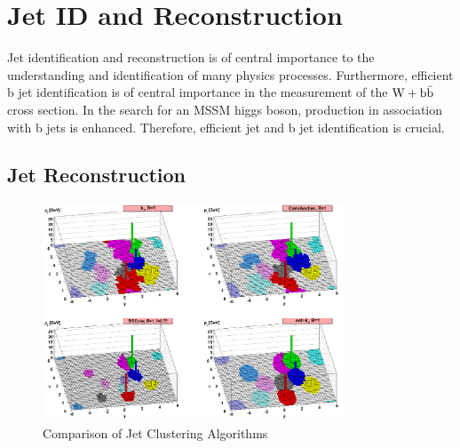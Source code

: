 \section{Jet ID and Reconstruction}

Jet identification and reconstruction is of central importance to the understanding
and identification of many physics processes. Furthermore, efficient b jet 
identification is of central importance
in the measurement of the $\mathrm{W+\mathrm{b\bar{b}}}$ cross section.  
In the search for an MSSM higgs boson, production in association with b jets
is enhanced. Therefore, efficient jet and b jet identification is crucial.

\subsection{Jet Reconstruction}
\begin{figure}[ht]
  \centering
	\includegraphics[width=0.8\textwidth]{images/AntiKTAlgo.png}
  	\caption[Comparison of Jet Clustering Algorithms]
   	{Comparison of Jet Clustering Algorithms}
	\label{fig:antiKt}
\end{figure}

